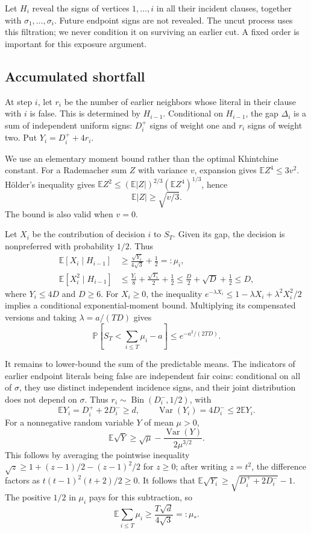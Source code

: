 \documentclass[11pt,a4paper]{article}
\theoremstyle{remark}
\newcommand{\E}{\mathbb E}
\newcommand{\Prb}{\mathbb P}
\begin{document}
Let $H_i$ reveal the signs of vertices $1,\ldots,i$ in all their incident
clauses, together with $\sigma_1,\ldots,\sigma_i$. Future endpoint signs
are not revealed. The uncut process uses this filtration; we never
condition it on surviving an earlier cut. A fixed order is important
for this exposure argument.

\subsection{Accumulated shortfall}

At step $i$, let $r_i$ be the number of earlier neighbors whose literal
in their clause with $i$ is false. This is determined by $H_{i-1}$.
Conditional on $H_{i-1}$, the gap $\Delta_i$ is a sum of independent
uniform signs: $D_i^+$ signs of weight one and $r_i$ signs of weight two.
Put $Y_i=D_i^++4r_i$.

We use an elementary moment bound rather than the optimal Khintchine
constant. For a Rademacher sum $Z$ with variance $v$, expansion gives
$\E Z^4\le3v^2$. H\"older's inequality gives
$\E Z^2\le(\E|Z|)^{2/3}(\E Z^4)^{1/3}$, hence
\[
 \E|Z|\ge\sqrt{v/3}.
\]
The bound is also valid when $v=0$.

Let $X_i$ be the contribution of decision $i$ to $S_T$.
Given its gap, the decision is nonpreferred with probability $1/2$.
Thus
\begin{align*}
 \E[X_i\mid H_{i-1}]&\ge
       \frac{\sqrt{Y_i}}{4\sqrt3}+\frac12=:\mu_i,\\
 \E[X_i^2\mid H_{i-1}]&\le
       \frac{Y_i}{8}+\frac{\sqrt{Y_i}}2+\frac12
       \le\frac D2+\sqrt D+\frac12\le D,
\end{align*}
where $Y_i\le4D$ and $D\ge6$.
For $X_i\ge0$, the inequality
$e^{-\lambda X_i}\le1-\lambda X_i+\lambda^2X_i^2/2$ implies a
conditional exponential-moment bound. Multiplying its compensated
versions and taking $\lambda=a/(TD)$ gives
\begin{equation}
 \Prb\left[S_T<\sum_{i\le T}\mu_i-a\right]
 \le e^{-a^2/(2TD)}.                                \label{eq:Stail}
\end{equation}

It remains to lower-bound the sum of the predictable means.
The indicators of earlier endpoint literals being false are independent
fair coins: conditional on all of $\sigma$, they use distinct independent
incidence signs, and their joint distribution does not depend on
$\sigma$. Thus $r_i\sim\operatorname{Bin}(D_i^-,1/2)$, with
\[
 \E Y_i=D_i^++2D_i^-\ge d,\qquad
 \operatorname{Var}(Y_i)=4D_i^-\le2\E Y_i.
\]
For a nonnegative random variable $Y$ of mean $\mu>0$,
\[
 \E\sqrt Y\ge\sqrt\mu-
                  \frac{\operatorname{Var}(Y)}{2\mu^{3/2}}.
\]
This follows by averaging the pointwise inequality
$\sqrt z\ge1+(z-1)/2-(z-1)^2/2$ for $z\ge0$; after writing
$z=t^2$, the difference factors as $t(t-1)^2(t+2)/2\ge0$.
It follows that $\E\sqrt{Y_i}\ge\sqrt{D_i^++2D_i^-}-1$.
The positive $1/2$ in $\mu_i$ pays for this subtraction, so
\[
 \E\sum_{i\le T}\mu_i\ge\frac{T\sqrt d}{4\sqrt3}=:\mu_*.
\]
\end{document}
